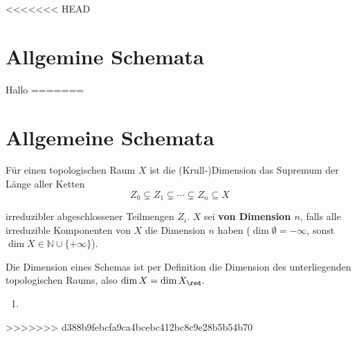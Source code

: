 <<<<<<< HEAD
\section{Allgemine Schemata}

Hallo
=======
\section{Allgemeine Schemata}
\begin{defn}[1]
  Für einen topologischen Raum $X$ ist die (Krull-)Dimension das Supremum
  der Länge aller Ketten
  \[
    Z_{0}\subsetneq Z_{1}\subsetneq\cdots\subsetneq Z_{n}\subseteq X
  \]

  irreduzibler abgeschlossener Teilmengen $Z_{i}$. $X$ sei \textbf{von
    Dimension $n$}, falls alle irreduzible Komponenten von $X$ die Dimension
  $n$ haben ($\dim\emptyset=-\infty$, sonst $\dim X\in\mathbb{N}\cup\{+\infty\}$).

  Die Dimension eines Schemas ist per Definition die Dimension des unterliegenden
  topologischen Raums, also $\dim X=\dim X_{\red}$.
\end{defn}

\begin{example}[2]
  \mbox{}
  \begin{enumerate}
  \item 
  \end{enumerate}
\end{example}
>>>>>>> d388b9febcfa9ca4bcebc412bc8c9e28b5b54b70
